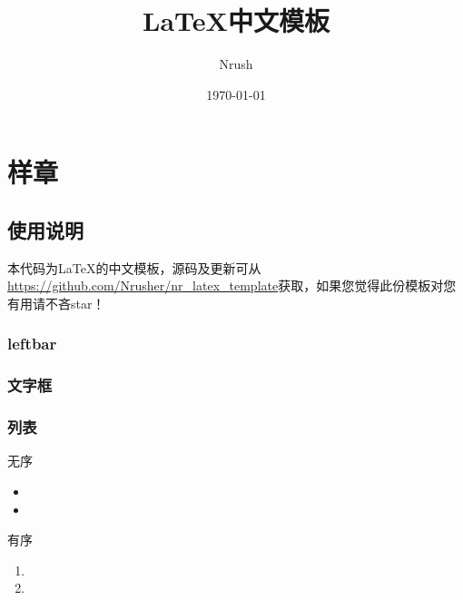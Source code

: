 \documentclass{book}
\begin{document}
\title{\LaTeX 中文模板}
\author{{Nrush}}
\date{\today}
\maketitle
\thispagestyle{empty}
\newpage

\tableofcontents
\setcounter{page}{1}
\newpage


\chapter{样章}
\setcounter{page}{1}
\section{使用说明}
本代码为\LaTeX 的中文模板，源码及更新可从\url{https://github.com/Nrusher/nr_latex_template}获取，如果您觉得此份模板对您有用请不吝star！

\subsection{leftbar}
\begin{leftbar}
    \zhlipsum[1][name = zhufu]
\end{leftbar}

\subsection{文字框}
\begin{framed}
    \zhlipsum[1][name = xiangyu]
\end{framed}

\subsection{列表}

\noindent 无序
\begin{itemize}
    \item \zhlipsum[1][name =jingyesi]
    \item \zhlipsum[2][name =jingyesi]
\end{itemize}

\noindent 有序
\begin{enumerate}
    \item \zhlipsum[1][name =jingyesi]
    \item \zhlipsum[2][name =jingyesi]
\end{enumerate}
\end{document}
